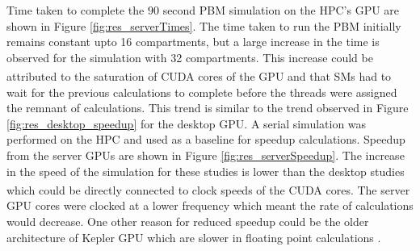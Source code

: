 \documentclass[review]{elsarticle}
\begin{document}
\begin{linenumbers}
Time taken to complete the $90$ second PBM simulation on the HPC's GPU are shown in 
Figure \ref{fig:res_serverTimes}. The time taken to run the PBM initially remains 
constant upto 16 compartments, but a large increase in the time is observed for the 
simulation with 32 compartments. This increase could be attributed to the saturation 
of CUDA\textsuperscript{\tiny\textregistered} cores of the GPU and that SMs had to wait for the previous calculations to 
complete before the threads were assigned the remnant of calculations. This trend 
is similar to the trend observed in Figure \ref{fig:res_desktop_speedup} for the 
desktop GPU. A serial simulation was performed on the HPC and used as a baseline 
for speedup calculations. Speedup from the server GPUs are shown in Figure 
\ref{fig:res_serverSpeedup}. The increase in the speed of the simulation for these 
studies is lower than the desktop studies which could be directly connected to clock 
speeds of the CUDA\textsuperscript{\tiny\textregistered} cores. The server GPU cores were clocked at a lower frequency 
which meant the rate of calculations would decrease. One other reason for reduced 
speedup could be the older architecture of Kepler GPU which are slower in floating 
point calculations \citep{Pascal2016}.


\end{linenumbers}
\end{document}
